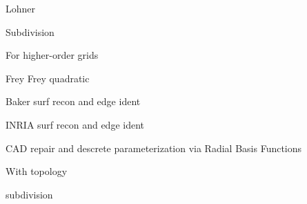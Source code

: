 \documentclass{article}
\begin{document}
Lohner\cite{lohner-regridding-surface}

Subdivision\cite{haimes-imr15-subdivision}

\cite{kim-takano-nakahashi-adjoint-adapt,kim-nakahashi-adjoint-adapt-viscous}

For higher-order grids\cite{unstruct-3d-ho-grid-dg-surf-recon}
\cite{jiao-wang-resonstruct-ho-surf}

Frey\cite{frey-imr9-about-surface-remeshing}
Frey quadratic\cite{dapogny-dobrzynski-frey-3d-adapt-surf-recon}

Baker surf recon and edge ident\cite{baker-imr13}

INRIA surf recon and edge ident\cite{borouchaki-surface-reconstruction}

CAD repair and descrete parameterization via Radial Basis Functions
\cite{cad-repair-discrete-param-rbf}

With topology\cite{lepage-habashi-cad-reconstruction}

subdivision\cite{haimes-imr15-subdivision}




\end{document}
